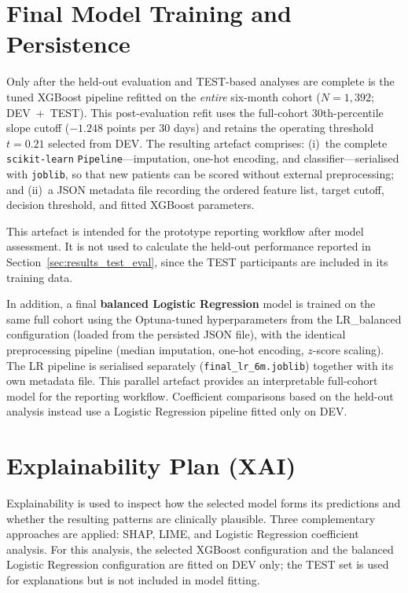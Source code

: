 \section{Final Model Training and Persistence}
\label{sec:methods_final_model}
Only after the held-out evaluation and TEST-based analyses are complete is the tuned XGBoost pipeline refitted on the \textit{entire} six-month cohort ($N\!=\!1{,}392$; \gls{DEV}~+~\gls{TEST}). This post-evaluation refit uses the full-cohort 30th-percentile slope cutoff ($-1.248$ points per 30 days) and retains the operating threshold $t=0.21$ selected from DEV.
The resulting artefact comprises:
(i)~the complete \texttt{scikit-learn} \texttt{Pipeline}---imputation, one-hot encoding, and classifier---serialised with \texttt{joblib}, so that new patients can be scored without external preprocessing; and
(ii)~a \gls{JSON} metadata file recording the ordered feature list, target cutoff, decision threshold, and fitted XGBoost parameters.

This artefact is intended for the prototype reporting workflow after model assessment. It is not used to calculate the held-out performance reported in Section~\ref{sec:results_test_eval}, since the TEST participants are included in its training data.

In addition, a final \textbf{balanced Logistic Regression} model is trained on the same full cohort using the Optuna-tuned hyperparameters from the LR\_balanced configuration (loaded from the persisted \gls{JSON} file), with the identical preprocessing pipeline (median imputation, one-hot encoding, $z$-score scaling).
The \gls{LR} pipeline is serialised separately (\texttt{final\_lr\_6m.joblib}) together with its own metadata file.
This parallel artefact provides an interpretable full-cohort model for the reporting workflow. Coefficient comparisons based on the held-out analysis instead use a Logistic Regression pipeline fitted only on DEV.

\section{Explainability Plan (XAI)}
\label{sec:methods_xai_plan}
Explainability is used to inspect how the selected model forms its predictions and whether the resulting patterns are clinically plausible.
Three complementary approaches are applied: \gls{SHAP}, \gls{LIME}, and Logistic Regression coefficient analysis.
For this analysis, the selected XGBoost configuration and the balanced Logistic Regression configuration are fitted on DEV only; the \gls{TEST} set is used for explanations but is not included in model fitting.

